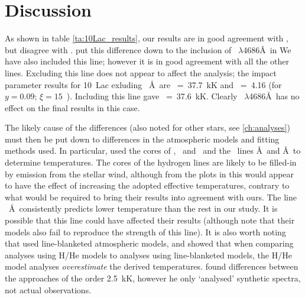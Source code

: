 \section{Discussion}
\label{sec:casestudy:discussion}

As shown in table \ref{ta:10Lac_results}, our results are in good
agreement with , but disagree with
.  put this difference down to the
inclusion of \heii\ $\lambda$4686\AA\ in  We have also
included this line; however it is in good agreement with all the other
lines. Excluding this line does not appear to affect the analysis; the
impact parameter results for 10~Lac exluding \hei\ \AA\ are
\teff~=~37.7~kK and \logg~=~4.16 (for $y=0.09$; $\xi =
15$~\kms). Including this line gave \teff~=~37.6~kK. Clearly \heii\
$\lambda$4686\AA\ has no effect on the final results in this case.

The likely cause of the differences (also noted for other stars, see
\ref{ch:analyses}) must then be put down to differences in the
atmospheric models and fitting methods used. In particular,
 used the cores of \ha, \hb\ and \hg\ and the \hei\ lines
\lam4471\AA\ and \lam4922\AA\ to determine temperatures. The cores of
the hydrogen lines are likely to be filled-in by emission from the
stellar wind, although from the plots in \acite{gr:92} this would
appear to have the effect of increasing the adopted effective
temperatures, contrary to what would be required to bring their
results into agreement with ours. The line \hei\ \AA\
consistently predicts lower temperature than the rest in our study.
It is possible that this line could have affected their results
(although  note that their models also fail to reproduce
the strength of this line). It is also worth noting that \acite{gr:92}
used line-blanketed atmospheric models, and
\ybcite{hu:98} showed that when comparing analyses using H/He models to
analyses using line-blanketed models, the H/He model analyses
\emph{overestimate} the derived temperatures. \acite{hu:98} found
differences between the approaches of the order 2.5~kK, however he
only `analysed' synthetic spectra, not actual observations.


